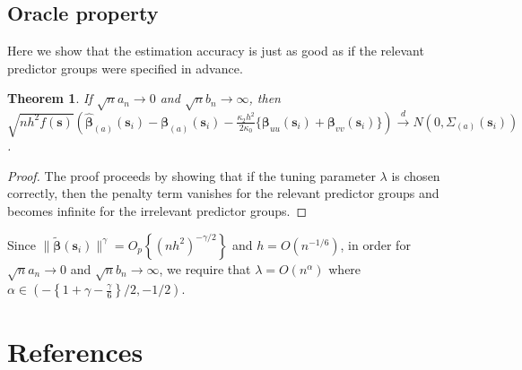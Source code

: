\documentclass[authoryear, review, 11pt]{elsarticle}
\newtheorem{theorem}{Theorem}[section]
\begin{document}
  \subsection{Oracle property}
    Here we show that the estimation accuracy is just as good as if the relevant predictor groups were specified in advance.

    \begin{theorem}
      If $\sqrt{n} a_n \to 0$ and $\sqrt{n} b_n \to \infty$, then $\sqrt{n h^2 f(\bm{s})} \left( \hat{\bm{\beta}}_{(a)} (\bm{s}_i) - \bm{\beta}_{(a)} (\bm{s}_i) - \frac{\kappa_2 h^2}{2 \kappa_0} \{ \bm{\beta}_{uu} (\bm{s}_i) + \bm{\beta}_{vv} (\bm{s}_i) \} \right) \xrightarrow{d} N(0,\Sigma_{(a)} (\bm{s}_i))$.
    \end{theorem}

    \begin{proof}
      The proof proceeds by showing that if the tuning parameter $\lambda$ is chosen correctly, then the penalty term vanishes for the relevant predictor groups and becomes infinite for the irrelevant predictor groups.

    \end{proof}

    Since $ \| \tilde{\bm{\beta}} (\bm{s}_i) \|^{\gamma} = O_p\left\{ ( n h^2 )^{-\gamma / 2} \right\} $ and $h = O(n^{-1/6})$, in order for $\sqrt{n} a_n \to 0$ and $\sqrt{n} b_n \to \infty$, we require that $\lambda = O(n^{\alpha})$ where $\alpha \in \left( - \left\{ 1 + \gamma - \frac{\gamma}{6} \right\} /2, -1/2 \right) $.

\section{References}


\end{document}
